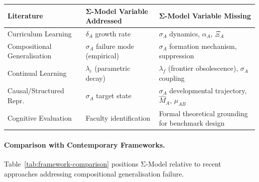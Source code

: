 \documentclass[11pt,a4paper]{article}
\begin{document}
\begin{center}
\begin{tabular}{>{\raggedright}p{3.5cm} >{\raggedright}p{3.5cm} >{\raggedright\arraybackslash}p{6.5cm}}
\toprule
\textbf{Literature} & \textbf{Σ-Model Variable Addressed} & \textbf{Σ-Model Variable Missing} \\
\midrule
Curriculum Learning & $\delta_A$ growth rate & $\sigma_A$ dynamics, $\alpha_A$, $\Xi_A$ \\
Compositional Generalisation & $\sigma_A$ failure mode (empirical) & $\sigma_A$ formation mechanism, suppression \\
Continual Learning & $\lambda_c$ (parametric decay) & $\lambda_f$ (frontier obsolescence), $\sigma_A$ coupling \\
Causal/Structured Repr. & $\sigma_A$ target state & $\sigma_A$ developmental trajectory, $\hat{M}_A$, $\mu_{AB}$ \\
Cognitive Evaluation & Faculty identification & Formal theoretical grounding for benchmark design \\
\bottomrule
\end{tabular}
\end{center}

\paragraph{Comparison with Contemporary Frameworks.}
Table~\ref{tab:framework-comparison} positions Σ-Model relative to recent
approaches addressing compositional generalisation failure.
\end{document}

